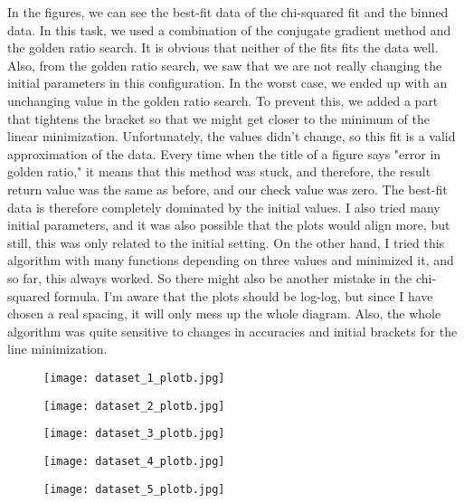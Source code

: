 In the figures, we can see the best-fit data of the chi-squared fit and the binned data. In this task, we used a combination of the conjugate gradient method and the golden ratio search. It is obvious that neither of the fits fits the data well. Also, from the golden ratio search, we saw that we are not really changing the initial parameters in this configuration. In the worst case, we ended up with an unchanging value in the golden ratio search. To prevent this, we added a part that tightens the bracket so that we might get closer to the minimum of the linear minimization. Unfortunately, the values didn't change, so this fit is a valid approximation of the data. Every time when the title of a figure says "error in golden ratio," it means that this method was stuck, and therefore, the result return value was the same as before, and our check value was zero. The best-fit data is therefore completely dominated by the initial values. I also tried many initial parameters, and it was also possible that the plots would align more, but still, this was only related to the initial setting. On the other hand, I tried this algorithm with many functions depending on three values and minimized it, and so far, this always worked. So there might also be another mistake in the chi-squared formula. I'm aware that the plots should be log-log, but since I have chosen a real spacing, it will only mess up the whole diagram. Also, the whole algorithm was quite sensitive to changes in accuracies and initial brackets for the line minimization.

\begin{figure}[h!]
    \centering
    \texttt{[image: dataset\_1\_plotb.jpg]}
\end{figure}

\begin{figure}[h!]
    \centering
    \texttt{[image: dataset\_2\_plotb.jpg]}
\end{figure}

\begin{figure}[h!]
    \centering
    \texttt{[image: dataset\_3\_plotb.jpg]}
\end{figure}

\begin{figure}[h!]
    \centering
    \texttt{[image: dataset\_4\_plotb.jpg]}
\end{figure}

\begin{figure}[h!]
    \centering
    \texttt{[image: dataset\_5\_plotb.jpg]}
\end{figure}








